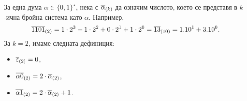 За една дума $\alpha \in \{0,1\}^\star$, 
нека с $\overline{\alpha}_{(k)}$ да означим числото, което се представя в $k$-ична бройна система като $\alpha$.
Например, 
\[\overline{1101}_{(2)} = 1 \cdot 2^3+1\cdot 2^2+0\cdot 2^1+1\cdot 2^0 = \overline{13}_{(10)} = 1.10^1 + 3.10^0.\]
За $k = 2$, имаме следната дефиниция:
\begin{itemize}
\item
  $\overline{\varepsilon}_{(2)} = 0$,
\item
  $\overline{\alpha 0}_{(2)} = 2\cdot \overline{\alpha}_{(2)}$,
\item
  $\overline{\alpha 1}_{(2)} = 2\cdot \overline{\alpha}_{(2)} + 1$.
\end{itemize}


